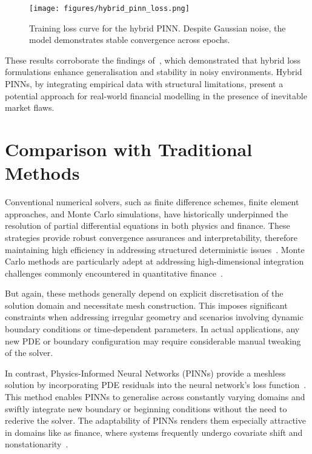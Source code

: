\documentclass[12pt,a4paper]{article}
\begin{document}
\begin{figure}[H]
  \centering
  \texttt{[image: figures/hybrid\_pinn\_loss.png]}
  \caption{Training loss curve for the hybrid PINN. Despite Gaussian noise, the model demonstrates stable convergence across epochs.}
  \label{fig:hybrid-loss-main}
\end{figure}



These results corroborate the findings of~\cite{yang2023hybrid}, which demonstrated that hybrid loss formulations enhance generalisation and stability in noisy environments. Hybrid PINNs, by integrating empirical data with structural limitations, present a potential approach for real-world financial modelling in the presence of inevitable market flaws.


\section{Comparison with Traditional Methods}

Conventional numerical solvers, such as finite difference schemes, finite element approaches, and Monte Carlo simulations, have historically underpinned the resolution of partial differential equations in both physics and finance. These strategies provide robust convergence assurances and interpretability, therefore maintaining high efficiency in addressing structured deterministic issues~\cite{leveque2007finite}. Monte Carlo methods are particularly adept at addressing high-dimensional integration challenges commonly encountered in quantitative finance~\cite{morton2005numerical}.

But again, these methods generally depend on explicit discretisation of the solution domain and necessitate mesh construction. This imposes significant constraints when addressing irregular geometry and scenarios involving dynamic boundary conditions or time-dependent parameters. In actual applications, any new PDE or boundary configuration may require considerable manual tweaking of the solver.

In contrast, Physics-Informed Neural Networks (PINNs) provide a meshless solution by incorporating PDE residuals into the neural network's loss function~\cite{raissi2019physics}. This method enables PINNs to generalise across constantly varying domains and swiftly integrate new boundary or beginning conditions without the need to rederive the solver. The adaptability of PINNs renders them especially attractive in domains like as finance, where systems frequently undergo covariate shift and nonstationarity~\cite{karniadakis2021physics}.
\end{document}
